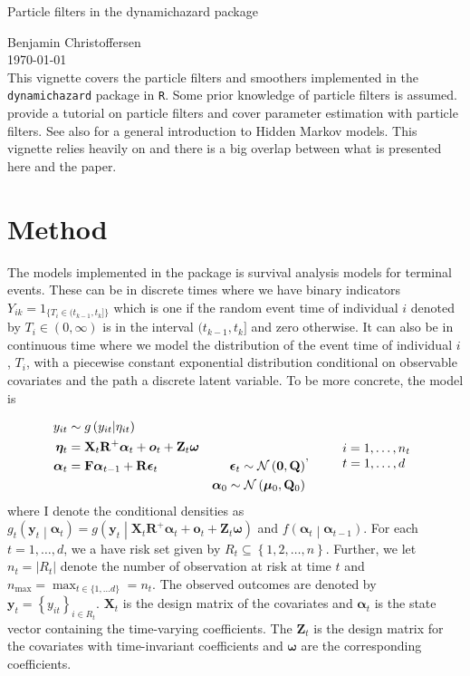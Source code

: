 \documentclass[notitlepage]{article}
\renewcommand{\vec}[1]{\bm{#1}}
\newcommand{\mat}[1]{\mathbf{#1}}
\newcommand{\Lbrace}[1]{\left\{ #1\right\}}
\newcommand{\Lparen}[1]{\left( #1\right)}
\newcommand{\Cond}[2]{ #1 \middle\vert  #2}
\newcommand{\optor}[2]{#1\Lparen{#2}}
\newcommand{\optorC}[3]{\optor{#1}{\Cond{#2}{#3}}}
\newcommand{\normal}[2]{\optor{\mathcal{N}}{#1,#2}}
\newcommand{\nPeriods}{d}
\newcommand{\nMax}{n_{\text{max}}}
\newcommand*{\myTitle}{\begingroup
\centering
{\LARGE Particle filters in the dynamichazard package} \\[\baselineskip]
\scshape

Benjamin Christoffersen \\[\baselineskip]
\today \\[\baselineskip]
\vspace*{3\baselineskip}
\endgroup}
\begin{document}
\myTitle
This vignette covers the particle filters and smoothers implemented in the \texttt{dynamichazard} package in \texttt{R}. Some prior knowledge of particle filters is assumed.  \cite{doucet09} provide a tutorial 
on particle filters and \cite{kantas15} cover parameter estimation with particle filters. 
See also \cite{cappe05} for a general introduction to Hidden Markov models. 
This vignette relies heavily on \cite{fearnhead10} and there is a big overlap between what
is presented here and the paper. 

\section{Method}
The models implemented in the package is survival analysis models for terminal
events. These can be in discrete times where we have binary indicators
$Y_{ik} = 1_{\{T_i \in (t_{k-1}, t_k]\}}$ which is one if the random event time
of individual $i$ denoted by 
$T_i\in (0,\infty)$ is in the interval $(t_{k-1}, t_k]$ and zero otherwise.
It can also be in continuous time where we model the distribution of the event 
time of individual $i$, $T_i$, with a
piecewise constant exponential distribution conditional on observable covariates 
and the path a discrete latent variable. To be more concrete, the model is

\begin{equation}\label{eqn:model}
\begin{aligned}
 	y_{it} &\sim \optorC{g}{y_{it}}{\eta_{it}} &  \\
%
 	\vec{\eta}_{t} &= \mat{X}_t\mat R^+\vec{\alpha}_t + \vec{o}_t +  
 	\mat{Z}_t\vec{\omega} & \\
%
 	\vec{\alpha}_t &= \mat{F}\vec{\alpha}_{t - 1} + \mat{R}\vec{\epsilon}_t&
 		\vec{\epsilon}_t \sim \normal{\vec 0}{\mat Q} \\
%
	& \vphantom{a} &	\vec{\alpha}_0 \sim \normal{\vec\mu_0}{\mat{Q}_0}
\end{aligned}, \qquad
%
\begin{array}{l} i = 1, \dots, n_t \\ t = 1, \dots, d \end{array}
\end{equation}%
%
where I  denote the conditional densities as %
$\optorC{g_t}{\vec{y}_t}{\vec{\alpha}_t} = %
	\optorC{g}{\vec{y}_t}{\mat{X}_t\mat R^+\vec{\alpha}_t + \vec{o}_t +  \mat{Z}_t\vec{\omega}}$ and $\optorC{f}{\vec{\alpha}_t}{\vec{\alpha}_{t-1}}$. 
For each $t=1,\dots,\nPeriods$, we a have risk set given by $R_t \subseteq \Lbrace{1,2,\dots,n}$. 
Further, we let $n_t = \vert R_t \vert$ denote the number of observation 
at risk at time $t$ 
and $\nMax = \max_{t \in\{1,\dots \nPeriods\}} = n_t$. The observed outcomes 
are denoted by $\vec{y}_t = \Lbrace{y_{it}}_{i \in R_t}$. $\mat{X}_t$ is the 
design matrix of the covariates and $\vec{\alpha}_t$ is the state vector 
containing the time-varying coefficients. 
The $\mat{Z}_t$ is the design matrix for the covariates with time-invariant
coefficients and $\vec{\omega}$ are the corresponding coefficients.
\end{document}
